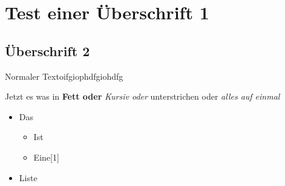 \hypertarget{test-einer-uxfcberschrift-1}{%
\section{Test einer Überschrift 1}\label{test-einer-uxfcberschrift-1}}

\hypertarget{uxfcberschrift-2}{%
\subsection{Überschrift 2}\label{uxfcberschrift-2}}

Normaler Textoifgiophdfgiohdfg

Jetzt es was in \textbf{Fett oder} \emph{Kursiv oder} unterstrichen oder
\emph{alles auf einmal}

\begin{itemize}
\item
  Das

  \begin{itemize}
  \item
    Ist
  \item
    Eine{[}1{]}
  \end{itemize}
\item
  Liste
\end{itemize}

\begin{longtable}[]{@{}l@{}}
\toprule
\bottomrule
\end{longtable}
